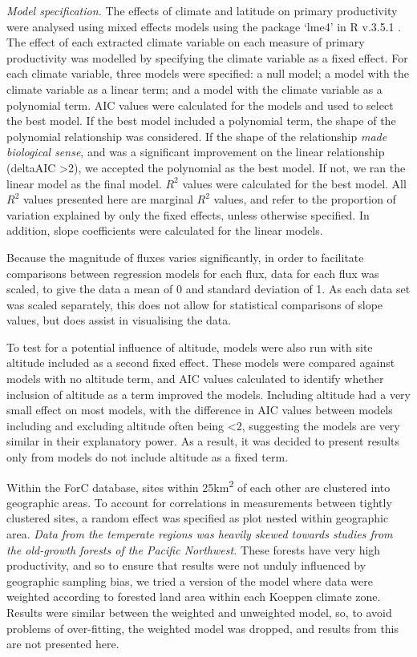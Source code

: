 \documentclass[]{article}
\begin{document}
\emph{Model specification.} The effects of climate and latitude on
primary productivity were analysed using mixed effects models using the
package `lme4' \citep{bates_fitting_2015} in R v.3.5.1
\citep{r_core_team_r:_2018}. The effect of each extracted climate
variable on each measure of primary productivity was modelled by
specifying the climate variable as a fixed effect. For each climate
variable, three models were specified: a null model; a model with the
climate variable as a linear term; and a model with the climate variable
as a polynomial term. AIC values were calculated for the models and used
to select the best model. If the best model included a polynomial term,
the shape of the polynomial relationship was considered. If the shape of
the relationship \emph{made biological sense}, and was a significant
improvement on the linear relationship (deltaAIC \textgreater{}2), we
accepted the polynomial as the best model. If not, we ran the linear
model as the final model. \(R^2\) values were calculated for the best
model. All \(R^2\) values presented here are marginal \(R^2\) values,
and refer to the proportion of variation explained by only the fixed
effects, unless otherwise specified. In addition, slope coefficients
were calculated for the linear models.

Because the magnitude of fluxes varies significantly, in order to
facilitate comparisons between regression models for each flux, data for
each flux was scaled, to give the data a mean of 0 and standard
deviation of 1. As each data set was scaled separately, this does not
allow for statistical comparisons of slope values, but does assist in
visualising the data.

To test for a potential influence of altitude, models were also run with
site altitude included as a second fixed effect. These models were
compared against models with no altitude term, and AIC values calculated
to identify whether inclusion of altitude as a term improved the models.
Including altitude had a very small effect on most models, with the
difference in AIC values between models including and excluding altitude
often being \textless{}2, suggesting the models are very similar in
their explanatory power. As a result, it was decided to present results
only from models do not include altitude as a fixed term.

Within the ForC database, sites within 25km\textsuperscript{2} of each
other are clustered into geographic areas. To account for correlations
in measurements between tightly clustered sites, a random effect was
specified as plot nested within geographic area. \emph{Data from the
temperate regions was heavily skewed towards studies from the old-growth
forests of the Pacific Northwest.} These forests have very high
productivity, and so to ensure that results were not unduly influenced
by geographic sampling bias, we tried a version of the model where data
were weighted according to forested land area within each Koeppen
climate zone. Results were similar between the weighted and unweighted
model, so, to avoid problems of over-fitting, the weighted model was
dropped, and results from this are not presented here.
\end{document}
